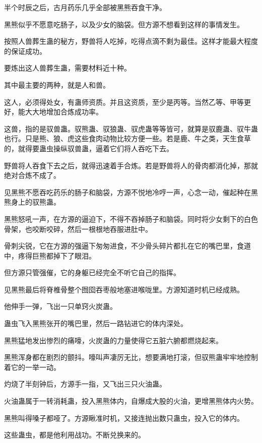 
\begin{this_body}

半个时辰之后，古月药乐几乎全部被黑熊吞食干净。

黑熊似乎不愿意吃肠子，以及少女的脑袋。但方源不想看到这样的事情发生。

按照人兽葬生蛊的秘方，野兽将人吃掉，吃得点滴不剩为最佳。这样才能最大程度的保证成功。

要炼出这人兽葬生蛊，需要材料近十种。

其中最主要的两种，就是人和兽。

这人，必须得处女，有蛊师资质。并且这资质，至少是丙等。当然乙等、甲等更好，能大大地增加合炼成功率。

这兽，指的是驭兽蛊。驭熊蛊、驭狼蛊、驭虎蛊等等皆可，就算是驭鹿蛊、驭牛蛊也行。只是熊、狼、虎这些食肉动物比较方便一些。若是鹿、牛之类，天生食草的，就得要蛊虫操纵驭兽蛊，逼着它们将人吞吃下去。

野兽将人吞食下去之后，就得迅速着手合炼。若是野兽将人的骨肉都消化掉，那就绝对合炼不成了。

见黑熊不愿吞吃药乐的肠子和脑袋，方源不悦地冷哼一声，心念一动，催起种在黑熊身上的驭熊蛊。

黑熊怒吼一声，在方源的逼迫下，不得不吞掉肠子和脑袋。同时将少女剩下的白色骨架，也咬断咬碎，然后一根根地吞服进肚中。

骨刺尖锐，它在方源的强逼下匆匆进食，不少骨头碎片都扎在它的嘴巴里，食道中，疼得巨熊都掉下了眼泪。

但方源只管强催，它的身躯已经完全不听它自己的指挥。

见黑熊最后将脊椎骨整个囫囵吞枣般地塞进喉咙里。方源知道时机已经成熟。

他伸手一弹，飞出一只单窍火炭蛊。

蛊虫飞入黑熊张开的嘴巴里，然后一路钻进它的体内深处。

黑熊猛地发出惨烈的痛嚎，火炭蛊的力量使得它五脏六腑都燃烧起来。

黑熊浑身都在剧烈的颤抖。嚎叫声凄厉无比，想要满地打滚，但驭熊蛊牢牢地控制着它的一举一动。

灼烧了半刻钟后，方源手一指，又飞出三只火油蛊。

火油蛊属于一转消耗蛊，投入黑熊体内，自爆成大股的火油，更增黑熊体内火势。

黑熊叫得嗓子都哑了。方源瞅准时机，又接连抛出数只蛊虫，投入它的体内。

这些蛊虫，都是他利用战功。不断兑换来的。


\end{this_body}
